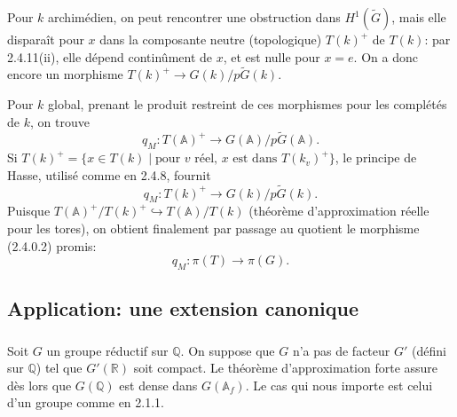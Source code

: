 \documentclass[12pt,a4paper]{article}
\theoremstyle{plain}
\theoremstyle{definition}
\theoremstyle{remark}
\newcommand{\QQ}{\mathbb{Q}}
\newcommand{\RR}{\mathbb{R}}
\newcommand{\Af}{\mathbb{A}_f}
\newcommand{\A}{\mathbb{A}}
\begin{document}
Pour $k$ archim\'edien, on peut rencontrer une obstruction dans $H^1(\tilde{G})$, mais elle dispara\^it pour $x$ dans la composante neutre (topologique) $T(k)^+$ de $T(k)$: par 2.4.11(ii), elle d\'epend contin\^ument de $x$, et est nulle pour $x = e$. On a donc encore un morphisme $T(k)^+ \to G(k)/p\tilde{G}(k)$.

Pour $k$ global, prenant le produit restreint de ces morphismes pour les compl\'et\'es de $k$, on trouve
\begin{equation}\label{eq:2.4.12.1}
q_M: T(\A)^+ \to G(\A)/p\tilde{G}(\A).
\end{equation}
Si $T(k)^+ = \{x \in T(k) \mid \text{pour } v \text{ r\'eel, } x \text{ est dans } T(k_v)^+\}$, le principe de Hasse, utilis\'e comme en 2.4.8, fournit
\begin{equation}\label{eq:2.4.12.2}
q_M: T(k)^+ \to G(k)/p\tilde{G}(k).
\end{equation}
Puisque $T(\A)^+/T(k)^+ \hookrightarrow T(\A)/T(k)$ (th\'eor\`eme d'approximation r\'eelle pour les tores), on obtient finalement par passage au quotient le morphisme (2.4.0.2) promis:
\[
q_M: \pi(T) \to \pi(G).
\]

\subsection{Application: une extension canonique}

\subsubsection{}

Soit $G$ un groupe r\'eductif sur $\QQ$. On suppose que $G$ n'a pas de facteur $G'$ (d\'efini sur $\QQ$) tel que $G'(\RR)$ soit compact. Le th\'eor\`eme d'approximation forte assure d\`es lors que $G(\QQ)$ est dense dans $G(\Af)$. Le cas qui nous importe est celui d'un groupe comme en 2.1.1.
\end{document}
